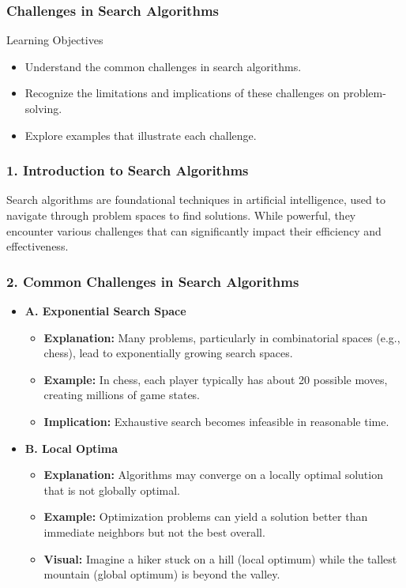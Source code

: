 \documentclass[aspectratio=169]{beamer}
\begin{document}
\begin{frame}[fragile]
    \frametitle{Challenges in Search Algorithms}
    \begin{block}{Learning Objectives}
        \begin{itemize}
            \item Understand the common challenges in search algorithms.
            \item Recognize the limitations and implications of these challenges on problem-solving.
            \item Explore examples that illustrate each challenge.
        \end{itemize}
    \end{block}
\end{frame}

\begin{frame}[fragile]
    \frametitle{1. Introduction to Search Algorithms}
    Search algorithms are foundational techniques in artificial intelligence, used to navigate through problem spaces to find solutions. 
    While powerful, they encounter various challenges that can significantly impact their efficiency and effectiveness.
\end{frame}

\begin{frame}[fragile]
    \frametitle{2. Common Challenges in Search Algorithms}
    \begin{itemize}
        \item \textbf{A. Exponential Search Space}
        \begin{itemize}
            \item \textbf{Explanation:} Many problems, particularly in combinatorial spaces (e.g., chess), lead to exponentially growing search spaces.
            \item \textbf{Example:} In chess, each player typically has about 20 possible moves, creating millions of game states.
            \item \textbf{Implication:} Exhaustive search becomes infeasible in reasonable time.
        \end{itemize}
        
        \item \textbf{B. Local Optima}
        \begin{itemize}
            \item \textbf{Explanation:} Algorithms may converge on a locally optimal solution that is not globally optimal.
            \item \textbf{Example:} Optimization problems can yield a solution better than immediate neighbors but not the best overall.
            \item \textbf{Visual:} Imagine a hiker stuck on a hill (local optimum) while the tallest mountain (global optimum) is beyond the valley.
        \end{itemize}
    \end{itemize}
\end{frame}
\end{document}
